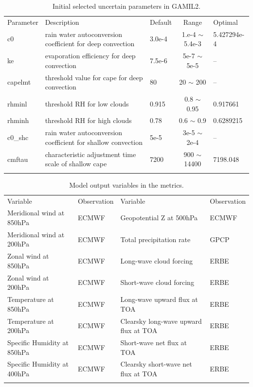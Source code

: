 \documentclass[gmd, manuscript]{copernicus}
\begin{document}
\begin{table}[t]
\caption{Initial selected uncertain parameters in GAMIL2.}
\begin{tabular}{l l l c l}
\tophline
Parameter & Description & Default & Range & Optimal \\
\middlehline
c0 & rain water autoconversion coefficient for deep convection & 3.0e-4 & 1.e-4 $\sim$ 5.4e-3 & 5.427294e-4\\
ke & evaporation efficiency for deep convection & 7.5e-6 & 5e-7 $\sim$ 5e-5 & -- \\
capelmt & threshold value for cape for deep convection & 80 & 20 $\sim$ 200 & -- \\
rhminl & threshold RH for low clouds & 0.915 & 0.8 $\sim$ 0.95 & 0.917661 \\
rhminh & threshold RH for high clouds & 0.78 & 0.6 $\sim$ 0.9 & 0.6289215 \\
c0\_shc & rain water autoconversion coefficient for shallow convection & 5e-5 & 3e-5 $\sim$ 2e-4 & -- \\
cmftau & characteristic adjustment time scale of shallow cape & 7200 & 900 $\sim$ 14400 & 7198.048  \\
\bottomhline
\end{tabular}
\belowtable{} %
\end{table}

\begin{table}[t]
\caption{Model output variables in the metrics.}
\begin{tabular}{l l l l}
\tophline
Variable & Observation & Variable & Observation \\
\middlehline
Meridional wind at 850hPa   & ECMWF & Geopotential Z at 500hPa              & ECMWF \\
Meridional wind at 200hPa   & ECMWF & Total precipitation rate              & GPCP \\
Zonal wind at 850hPa        & ECMWF & Long-wave cloud forcing                & ERBE \\
Zonal wind at 200hPa        & ECMWF & Short-wave cloud forcing               & ERBE \\
Temperature at 850hPa       & ECMWF & Long-wave upward flux at TOA          & ERBE \\
Temperature at 200hPa       & ECMWF & Clearsky long-wave upward flux at TOA & ERBE \\
Specific Humidity at 850hPa & ECMWF & Short-wave net flux at TOA            & ERBE \\
Specific Humidity at 400hPa & ECMWF & Clearsky short-wave net flux at TOA   & ERBE \\
\bottomhline
\end{tabular}
\belowtable{} %
\end{table}
\end{document}
